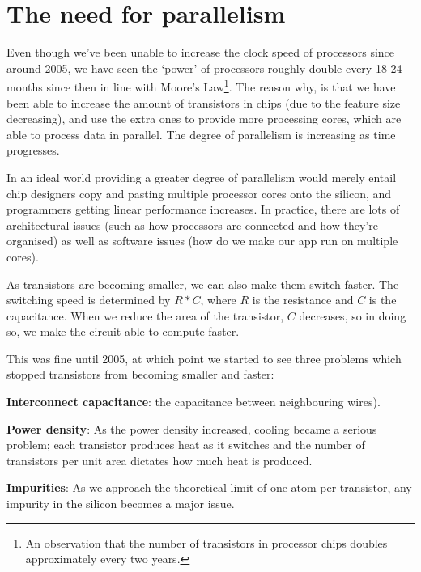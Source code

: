 

\section{The need for parallelism}

Even though we've been unable to increase the clock speed of processors since
around 2005, we have seen the `power' of processors roughly double every 18-24
months since then in line with Moore's Law\footnote{An observation that the
number of transistors in processor chips doubles approximately every two years.}.
The reason why, is that we have been able to increase the amount of transistors
in chips (due to the feature size decreasing), and use the extra ones to provide
more processing cores, which are able to process data in parallel. The degree of
parallelism is increasing as time progresses.

In an ideal world providing a greater degree of parallelism would merely entail
chip designers copy and pasting multiple processor cores onto the silicon, and
programmers getting linear performance increases. In practice, there are lots of
architectural issues (such as how processors are connected and how they're
organised) as well as software issues (how do we make our app run on multiple
cores).

As transistors are becoming smaller, we can also make them switch faster. The
switching speed is determined by $R*C$, where $R$ is the resistance and $C$ is
the capacitance. When we reduce the area of the transistor, $C$ decreases, so in
doing so, we make the circuit able to compute faster.

This was fine until 2005, at which point we started to see three problems which
stopped transistors from becoming smaller and faster:

\begin{description}
  \item \textbf{Interconnect capacitance}: the capacitance between neighbouring
  wires).
  \item \textbf{Power density}: As the power density increased, cooling became
  a serious problem; each transistor produces heat as it switches and the number
  of transistors per unit area dictates how much heat is produced.
  \item \textbf{Impurities}: As we approach the theoretical limit of one atom
  per transistor, any impurity in the silicon becomes a major issue.
\end{description}

